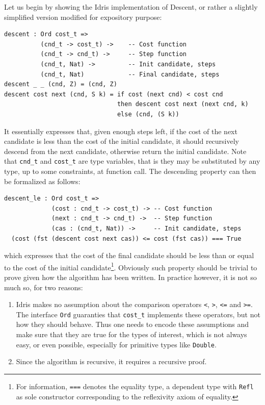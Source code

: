\documentclass[]{report}
\begin{document}
Let us begin by showing the Idris implementation of Descent, or rather
a slightly simplified version modified for expository purpose:
\begin{verbatim}
descent : Ord cost_t =>
          (cnd_t -> cost_t) ->    -- Cost function
          (cnd_t -> cnd_t) ->     -- Step function
          (cnd_t, Nat) ->         -- Init candidate, steps
          (cnd_t, Nat)            -- Final candidate, steps
descent _ _ (cnd, Z) = (cnd, Z)
descent cost next (cnd, S k) = if cost (next cnd) < cost cnd
                               then descent cost next (next cnd, k)
                               else (cnd, (S k))
\end{verbatim}
It essentially expresses that, given enough steps left, if the cost of
the next candidate is less than the cost of the initial candidate, it
should recursively descend from the next candidate, otherwise return
the initial candidate.  Note that \texttt{cnd\_t} and \texttt{cost\_t}
are type variables, that is they may be substituted by any type, up to
some constraints, at function call.  The descending property can then
be formalized as follows:
\begin{verbatim}
descent_le : Ord cost_t =>
             (cost : cnd_t -> cost_t) -> -- Cost function
             (next : cnd_t -> cnd_t) ->  -- Step function
             (cas : (cnd_t, Nat)) ->     -- Init candidate, steps
  (cost (fst (descent cost next cas)) <= cost (fst cas)) === True
\end{verbatim}
which expresses that the cost of the final candidate should be less
than or equal to the cost of the initial candidate\footnote{For
  information, \texttt{===} denotes the equality type, a dependent
  type with \texttt{Refl} as sole constructor corresponding to the
  reflexivity axiom of equality.}.  Obviously such property should be
trivial to prove given how the algorithm has been written.  In
practice however, it is not so much so, for two reasons:
\begin{enumerate}
\item Idris makes no assumption about the comparison operators
  \texttt{<}, \texttt{>}, \texttt{<=} and \texttt{>=}.  The interface
  \texttt{Ord} guaranties that \texttt{cost\_t} implements these
  operators, but not how they should behave.  Thus one needs to encode
  these assumptions and make sure that they are true for the types of
  interest, which is not always easy, or even possible, especially for
  primitive types like \texttt{Double}.
\item Since the algorithm is recursive, it requires a recursive proof.
\end{enumerate}
\end{document}
